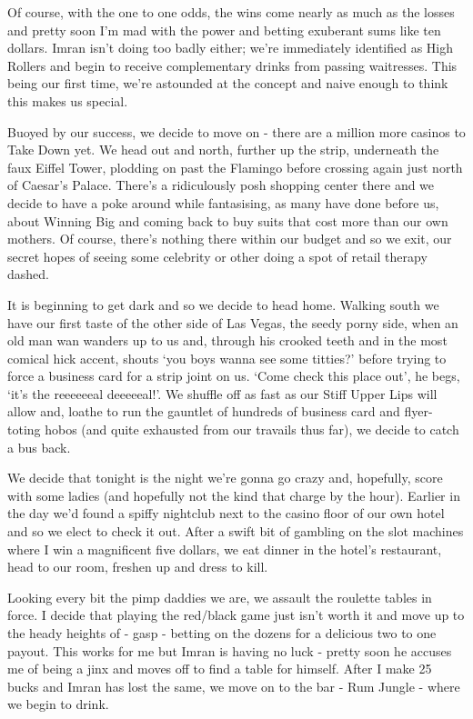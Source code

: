 \documentclass[a5paper,10pt,titlepage,draft]{book}
\begin{document}
Of course, with the one to one odds, the wins come nearly as much as the losses and pretty soon I'm mad with the power and betting exuberant sums like ten dollars.  Imran isn't doing too badly either; we're immediately identified as High Rollers and begin to receive complementary drinks from passing waitresses.  This being our first time, we're astounded at the concept and naive enough to think this makes us special.

Buoyed by our success, we decide to move on - there are a million more casinos to Take Down yet.  We head out and north, further up the strip, underneath the faux Eiffel Tower, plodding on past the Flamingo before crossing again just north of Caesar's Palace.  There's a ridiculously posh shopping center there and we decide to have a poke around while fantasising, as many have done before us, about Winning Big and coming back to buy suits that cost more than our own mothers.  Of course, there's nothing there within our budget and so we exit, our secret hopes of seeing some celebrity or other doing a spot of retail therapy dashed.

It is beginning to get dark and so we decide to head home.  Walking south we have our first taste of the other side of Las Vegas, the seedy porny side, when an old man wan wanders up to us and, through his crooked teeth and in the most comical hick accent, shouts `you boys wanna see some titties?' before trying to force a business card for a strip joint on us. `Come check this place out', he begs, `it's the reeeeeeal deeeeeal!'.  We shuffle off as fast as our Stiff Upper Lips will allow and, loathe to run the gauntlet of hundreds of business card and flyer-toting hobos (and quite exhausted from our travails thus far), we decide to catch a bus back.

We decide that tonight is the night we're gonna go crazy and, hopefully, score with some ladies (and hopefully not the kind that charge by the hour).  Earlier in the day we'd found a spiffy nightclub next to the casino floor of our own hotel and so we elect to check it out.  After a swift bit of gambling on the slot machines where I win a magnificent five dollars, we eat dinner in the hotel's restaurant, head to our room, freshen up and dress to kill.

Looking every bit the pimp daddies we are, we assault the roulette tables in force.  I decide that playing the red/black game just isn't worth it and move up to the heady heights of - gasp - betting on the dozens for a delicious two to one payout.  This works for me but Imran is having no luck - pretty soon he accuses me of being a jinx and moves off to find a table for himself.  After I make 25 bucks and Imran has lost the same, we move on to the bar - Rum Jungle - where we begin to drink.
\end{document}
